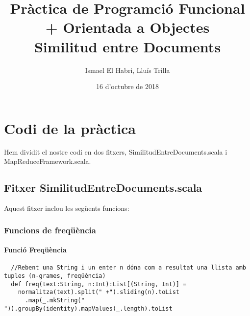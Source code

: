 \documentclass[11pt,a4paper,twoside]{report}
\begin{document}
\title{Pràctica de Programció Funcional + Orientada a Objectes\\
\large Similitud entre Documents}
\author{Ismael El Habri, Lluís Trilla}
\date{16 d'octubre de 2018}
\maketitle

\tableofcontents

\chapter{Codi de la pràctica}

Hem dividit el nostre codi en dos fitxers, SimilitudEntreDocuments.scala i MapReduceFramework.scala.

\section{Fitxer SimilitudEntreDocuments.scala}

Aquest fitxer inclou les següents funcions:
\subsection{Funcions de freqüència}

\subsubsection{Funció Freqüència}
\begin{lstlisting}
  //Rebent una String i un enter n dóna com a resultat una llista amb tuples (n-grames, freqüència)
  def freq(text:String, n:Int):List[(String, Int)] =
    normalitza(text).split(" +").sliding(n).toList
      .map(_.mkString(" ")).groupBy(identity).mapValues(_.length).toList
\end{lstlisting}
\end{document}
